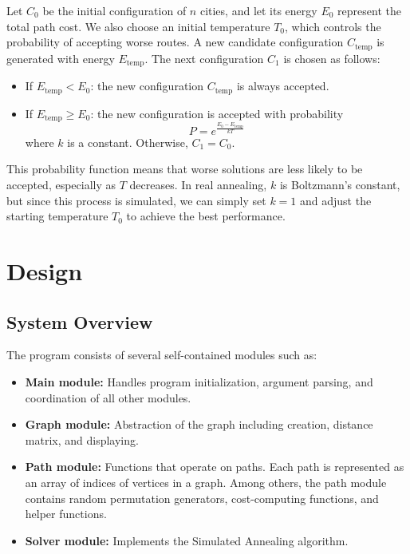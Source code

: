 \documentclass{article}
\begin{document}
Let \( C_0 \) be the initial configuration of \( n \) cities, and let its energy \( E_0 \) represent the total path cost. We also choose an initial temperature \( T_0 \), which controls the probability of accepting worse routes. A new candidate configuration \( C_{\text{temp}} \) is generated with energy \( E_{\text{temp}} \). The next configuration \( C_1 \) is chosen as follows:

\begin{itemize}
    \item If \( E_{\text{temp}} < E_0 \): the new configuration \( C_{\text{temp}} \) is always accepted.
    \item If \( E_{\text{temp}} \ge E_0 \): the new configuration is accepted with probability
    \[
    P = e^{\frac{E_0 - E_{\text{temp}}}{kT}}
    \]
    where \( k \) is a constant. Otherwise, \( C_1 = C_0 \).
\end{itemize}

This probability function means that worse solutions are less likely to be accepted, especially as \( T \) decreases. In real annealing, \( k \) is Boltzmann’s constant, but since this process is simulated, we can simply set \( k = 1 \) and adjust the starting temperature \( T_0 \) to achieve the best performance.

\section{Design}

\subsection{System Overview}

The program consists of several self-contained modules such as:

\begin{itemize}
    \item \textbf{Main module:} Handles program initialization, argument parsing, and coordination of all other modules.
    \item \textbf{Graph module:} Abstraction of the graph including creation, distance matrix, and displaying.
    \item \textbf{Path module:} Functions that operate on paths. Each path is represented as an array of indices of vertices in a graph. Among others, the path module contains random permutation generators, cost-computing functions, and helper functions. 
    \item \textbf{Solver module:} Implements the Simulated Annealing algorithm.
\end{itemize}
\end{document}
